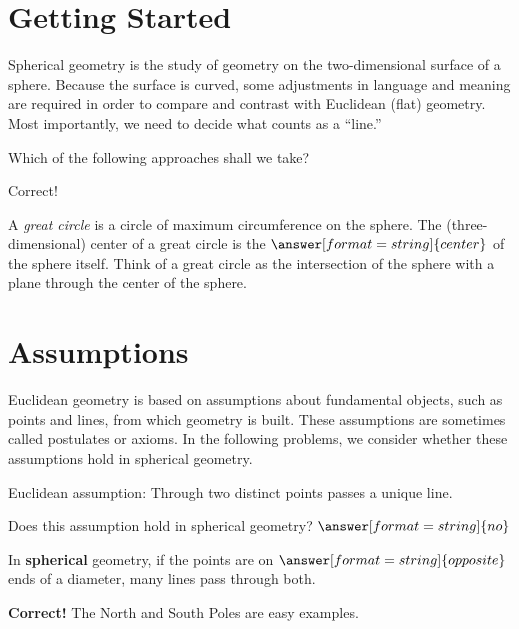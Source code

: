 \documentclass{ximera}
\begin{document}
\section*{Getting Started}


\begin{problem}
Spherical geometry is the study of geometry on the two-dimensional surface of a sphere.  Because the surface is curved, some adjustments in language and meaning are required in order to compare and contrast with Euclidean (flat) geometry.  Most importantly, we need to decide what counts as a ``line.''

Which of the following approaches shall we take?  

\begin{multipleChoice}
\end{multipleChoice}
\begin{problem}
Correct! 

A \emph{great circle} is a circle of maximum circumference on the sphere.  The (three-dimensional) center of a great circle is the $\answer[format=string]{center}$ of the sphere itself.  Think of a great circle as the intersection of the sphere with a plane through the center of the sphere.  

\end{problem}

\end{problem}

\section*{Assumptions}
Euclidean geometry is based on assumptions about fundamental objects, such as points and lines, from which geometry is built. These assumptions are sometimes called postulates or axioms. In the following problems, we consider whether these assumptions hold in spherical geometry. 


\begin{problem} %
Euclidean assumption: Through two distinct points passes a unique line.  

Does this assumption hold in spherical geometry? 
$\answer[format=string]{no}$

\begin{problem}

In \textbf{spherical} geometry, if the points are on $\answer[format=string]{opposite}$ ends of a diameter, many lines pass through both.
\begin{feedback}[correct]
\textbf{Correct!} The North and South Poles are easy examples.  
\end{feedback}
\end{problem}
\end{problem}
\end{document}
